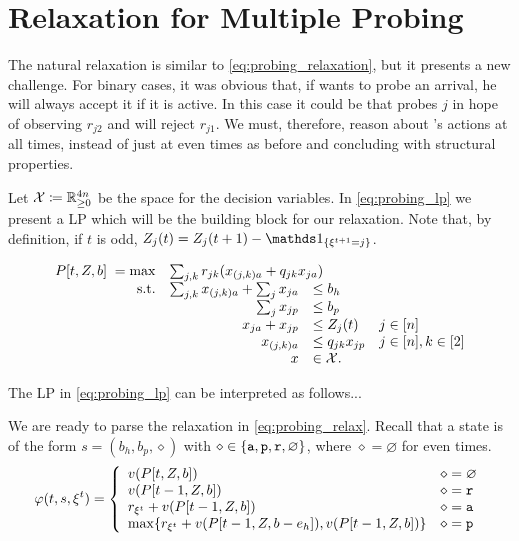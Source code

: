 \documentclass[letterpaper,11pt]{article}
\begin{document}


\section{Relaxation for Multiple Probing}

The natural relaxation is similar to \cref{eq:probing_relaxation}, but it presents a new challenge.
For binary cases, it was obvious that, if \off wants to probe an arrival, he will always accept it if it is active.
In this case it could be that \off probes $j$ in hope of observing $r_{j2}$ and will reject $r_{j1}$.
We must, therefore, reason about \off's actions at all times, instead of just at even times as before and concluding with structural properties.

Let $\mathcal{X}\coloneqq\mathbb{R}_{\geq 0}^{4n}$ be the space for the decision variables.
In \cref{eq:probing_lp} we present a LP which will be the building block for our relaxation.
Note that, by definition, if $t$ is odd, $Z_j(t)=Z_j(t+1)-\In{\xi^{t+1}=j}$.

\begin{equation}\label{eq:probing_lp}
\begin{array}{rrll}
P[t,Z,b] \;= \max & \multicolumn{3}{l}{\sum_{j,k}r_{jk}(x_{(j,k)a}+q_{jk}x_{ja})} \\
\text{s.t.}& \sum_{j,k}x_{(j,k)a}+\sum_jx_{ja} &\leq b_h  \\
&  \sum_j x_{jp} & \leq b_p   \\
&  x_{ja} +x_{jp} & \leq Z_j(t)  & j\in [n] \\
& x_{(j,k)a} &\leq q_{jk}x_{jp} &  j \in [n],k\in [2]\\ 
& x&\in\calX.
\end{array}
\end{equation}

The LP in \cref{eq:probing_lp} can be interpreted as follows...\todonote

We are ready to parse the relaxation in \cref{eq:probing_relax}.
Recall that a state is of the form $s=(b_h,b_p,\diamond)$ with $\diamond\in \{\texttt{a},\texttt{p},\texttt{r},\varnothing\}$, where $\diamond=\varnothing$ for even times.
\begin{equation}\label{eq:probing_relax}
\varphi(t,s,\xi^t) = \left\{ 
\begin{array}{ll}
v(P[t,Z,b]) & \diamond=\varnothing \\ 
v(P[t-1,Z,b]) & \diamond = \texttt{r} \\ 
r_{\xi^t}+v(P[t-1,Z,b]) & \diamond = \texttt{a} \\ 
\max\{r_{\xi^t}+v(P[t-1,Z,b-e_h]),v(P[t-1,Z,b])\} & \diamond = \texttt{p}
\end{array} 
\right.
\end{equation}
\end{document}
